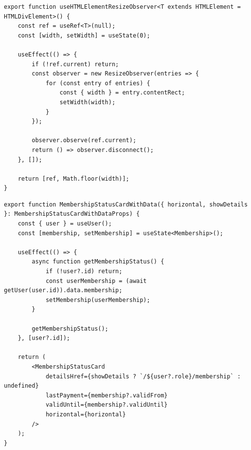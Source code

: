 \documentclass[../../spr.tex]{subfiles}
\begin{document}
\begin{lstlisting}[caption=Przykład niestandardowego \textit{hooka}. Służy do obserwacji szerokości elementu i jest wykorzsytany przy obsłudze responsywności.]
export function useHTMLElementResizeObserver<T extends HTMLElement = HTMLDivElement>() {
    const ref = useRef<T>(null);
    const [width, setWidth] = useState(0);

    useEffect(() => {
        if (!ref.current) return;
        const observer = new ResizeObserver(entries => {
            for (const entry of entries) {
                const { width } = entry.contentRect;
                setWidth(width);
            }
        });

        observer.observe(ref.current);
        return () => observer.disconnect();
    }, []);

    return [ref, Math.floor(width)];
}
\end{lstlisting}

\begin{lstlisting}[caption=Przykład komponentu pobierającego dane z zewnętrznego API. Wykorzystywane są funkcje generowane przez \textit{Orval} co eliminuje konieczność ręcznego korzystania z biblioteki \textit{axios}.]
export function MembershipStatusCardWithData({ horizontal, showDetails }: MembershipStatusCardWithDataProps) {
    const { user } = useUser();
    const [membership, setMembership] = useState<Membership>();

    useEffect(() => {
        async function getMembershipStatus() {
            if (!user?.id) return;
            const userMembership = (await getUser(user.id)).data.membership;
            setMembership(userMembership);
        }

        getMembershipStatus();
    }, [user?.id]);

    return (
        <MembershipStatusCard
            detailsHref={showDetails ? `/${user?.role}/membership` : undefined}
            lastPayment={membership?.validFrom}
            validUntil={membership?.validUntil}
            horizontal={horizontal}
        />
    );
}
\end{lstlisting}
\end{document}

